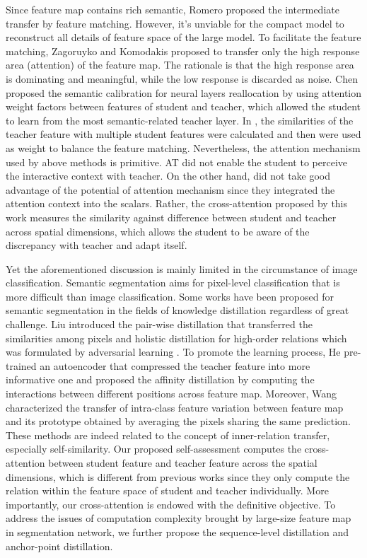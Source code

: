 \documentclass[10pt,twocolumn,letterpaper]{article}
\begin{document}
Since feature map contains rich semantic, Romero \etal \cite{Romero2015FitNetsHF} proposed the intermediate transfer by feature matching. However, it's unviable for the compact model to reconstruct all details of feature space of the large model. To facilitate the feature matching, Zagoruyko and Komodakis \cite{Zagoruyko2017PayingMA} proposed to transfer only the high response area (\ie attention) of the feature map. The rationale is that the high response area is dominating and meaningful, while the low response is discarded as noise. Chen \etal \cite{Chen2020CrossLayerDW} proposed the semantic calibration for neural layers reallocation by using attention weight factors between features of student and teacher, which allowed the student to learn from the most semantic-related teacher layer. In \cite{Ji2021ShowAA}, the similarities of the teacher feature with multiple student features were calculated and then were used as weight to balance the feature matching. Nevertheless, the attention mechanism used by above methods is primitive. AT \cite{Zagoruyko2017PayingMA} did not enable the student to perceive the interactive context with teacher. On the other hand, \cite{Chen2020CrossLayerDW,Ji2021ShowAA} did not take good advantage of the potential of attention mechanism since they integrated the attention context into the scalars. Rather, the cross-attention proposed by this work measures the similarity against difference between student and teacher across spatial dimensions, which allows the student to be aware of the discrepancy with teacher and adapt itself. 

Yet the aforementioned discussion is mainly limited in the circumstance of image classification. Semantic segmentation aims for pixel-level classification that is more difficult than image classification. Some works have been proposed for semantic segmentation in the fields of knowledge distillation regardless of great challenge. Liu \etal \cite{liu2019structured} introduced the pair-wise distillation that transferred the similarities among pixels and holistic distillation for high-order relations which was formulated by adversarial learning \cite{goodfellow2014generative}. To promote the learning process, He \etal \cite{he2019knowledge} pre-trained an autoencoder that compressed the teacher feature into more informative one and proposed the affinity distillation by computing the interactions between different positions across feature map. Moreover, Wang \etal \cite{Wang2020IntraclassFV} characterized the transfer of intra-class feature variation between feature map and its prototype obtained by averaging the pixels sharing the same prediction. These methods are indeed related to the concept of inner-relation transfer, especially self-similarity. Our proposed self-assessment computes the cross-attention between student feature and teacher feature across the spatial dimensions, which is different from previous works since they only compute the relation within the feature space of student and teacher individually. More importantly, our cross-attention is endowed with the definitive objective. To address the issues of computation complexity brought by large-size feature map in segmentation network, we further propose the sequence-level distillation and anchor-point distillation.
\end{document}
